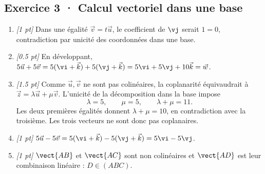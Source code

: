 \subsection*{Exercice 3 · Calcul vectoriel dans une base}\begin{enumerate}

\item \textit{[1 pt]} Dans une égalité $\vec v=t\vec u$, le coefficient de $\vj $ serait $1=0$, contradiction par unicité des coordonnées dans une base.

\item \textit{[\num{0,5} pt]} En développant, $5\vec u+5\vec v=5(\vi +\vec k)+5(\vj +\vec k)=5\vi +5\vj +10\vec k=\vec w$.

\item \textit{[\num{1,5} pt]} Comme $\vec u,\vec v$ ne sont pas colinéaires, la coplanarité équivaudrait à $\vec z=\lambda\vec u+\mu\vec v$. L'unicité de la décomposition dans la base impose
\[\lambda=5,\qquad\mu=5,\qquad\lambda+\mu=11.\]
Les deux premières égalités donnent $\lambda+\mu=10$, en contradiction avec la troisième. Les trois vecteurs ne sont donc pas coplanaires.

\item \textit{[1 pt]} $5\vec u-5\vec v=5(\vi +\vec k)-5(\vj +\vec k)=5\vi -5\vj $.

\item \textit{[1 pt]} $\vect{AB}$ et $\vect{AC}$ sont non colinéaires et $\vect{AD}$ est leur combinaison linéaire : $D\in(ABC)$.

\end{enumerate}


